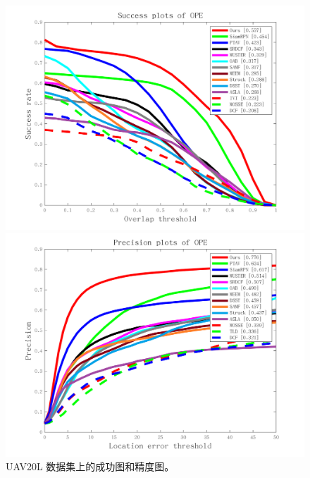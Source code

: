 \begin{figure}[t]
\begin{minipage}{0.5\linewidth}
  \centering
  \centerline{\includegraphics[width=1.0\textwidth]{Img/globally/UAV20L/quality_plot_overlap_OPE_AUC.png}}
\end{minipage}
\hfill
\begin{minipage}{0.5\linewidth}
  \centering
  \centerline{\includegraphics[width=1.0\textwidth]{Img/globally/UAV20L/quality_plot_error_OPE_threshold.png}}
\end{minipage}
\caption{UAV20L 数据集上的成功图和精度图。}
\end{figure}


